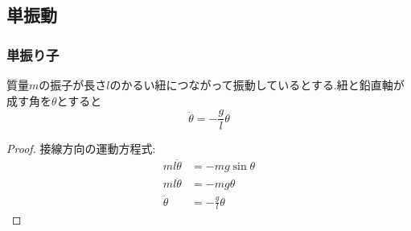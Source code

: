\documentclass[dvipdfmx,uplatex]{jsarticle}
\begin{document}
\subsection{単振動}

\subsubsection{単振り子}
\begin{theo}
質量$m$の振子が長さ$l$のかるい紐につながって振動しているとする.紐と鉛直軸が成す角を$\theta$とすると
\[
\ddot{\theta} =  - \frac{g}{l} \theta
\]
\end{theo}


\begin{proof}
接線方向の運動方程式:
\begin{align*}
ml\ddot{\theta} &= -mg\sin \theta \\
ml\ddot{\theta} &= -mg \theta \\
\ddot{\theta} &= - \frac{g}{l} \theta
\end{align*}
\end{proof}
\end{document}
